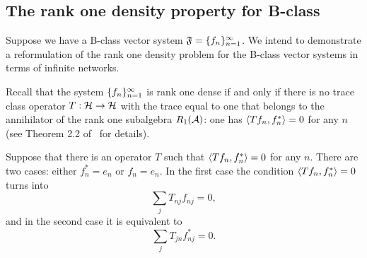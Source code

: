 \documentclass[12pt,oneside,a4paper]{amsart}
\begin{document}
    \medskip
    \subsection{The rank one density property for B-class}
      Suppose we have a B-class vector system $\fsys=\seq{f}$.
      We intend to demonstrate a reformulation of the rank one density problem for
        the B-class vector systems in terms of infinite networks.

      Recall that the system $\seq{f}$ is rank one dense
        if and only if there is no trace class operator $T: \cal{H} \to \cal{H}$ with the trace equal to one
        that belongs to the annihilator of the rank one subalgebra $R_1(\cal{A})$: one has $\inner{Tf_n}{f_n^*} = 0$ for any $n$
        (see Theorem 2.2 of~\cite{katavolos} for details).

      Suppose that there is an operator $T$ such that $\inner{Tf_n}{f_n^*} = 0$ for any $n$.
      There are two cases: either $f^*_n = e_n$ or $f_n = e_n$.
      In the first case the condition $\inner{Tf_n}{f_n^*} = 0$ turns into
      \begin{equation}
          \label{left-eqn}
          \sum_j T_{nj} f_{nj} = 0,
      \end{equation}
      and in the second case it is equivalent to
      \begin{equation}
          \label{right-eqn}
          \sum_j T_{jn} f^*_{nj} = 0.
      \end{equation}
\end{document}
